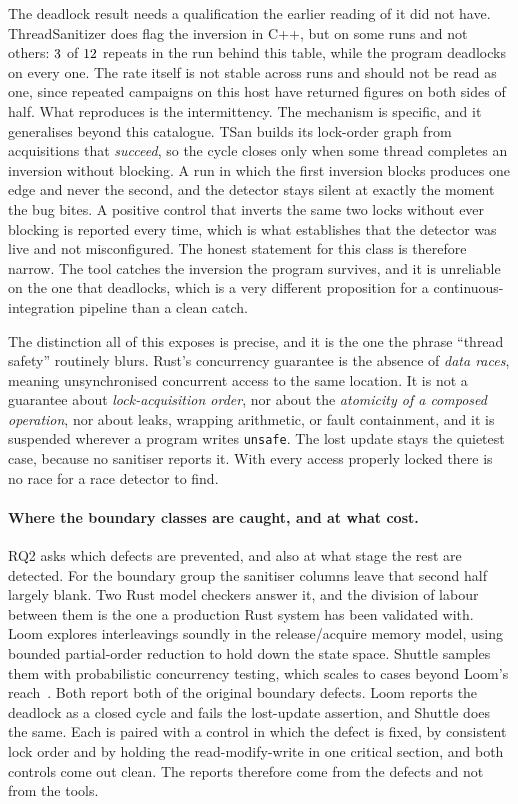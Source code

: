 \documentclass[english,oneside,a4paper,censored,csm,software-track-2020]{HYthesisML}
\begin{document}
The deadlock result needs a qualification the earlier reading of it did not have.
ThreadSanitizer does flag the inversion in C++, but on some runs and not others:
$3$ of $12$ repeats in the run behind this table, while the
program deadlocks on every one. The rate itself is not stable across runs and should not be read
as one, since repeated campaigns on this host have returned figures on both sides of half. What
reproduces is the intermittency. The mechanism is specific, and it generalises beyond this catalogue. TSan builds its lock-order
graph from acquisitions that \emph{succeed}, so the cycle closes only when some thread completes
an inversion without blocking. A run in which the first inversion blocks produces one edge and
never the second, and the detector stays silent at exactly the moment the bug bites. A
positive control that inverts the same two locks without ever blocking is reported every time,
which is what establishes that the detector was live and not misconfigured. The honest
statement for this class is therefore narrow. The tool catches the inversion the program survives,
and it is unreliable on the one that deadlocks, which is a very different proposition for a
continuous-integration pipeline than a clean catch.

The distinction all of this exposes is precise, and it is the one the phrase ``thread
safety'' routinely blurs. Rust's concurrency guarantee is the absence of \emph{data races},
meaning unsynchronised concurrent access to the same location. It is not a guarantee about
\emph{lock-acquisition order}, nor about the \emph{atomicity of a composed operation}, nor
about leaks, wrapping arithmetic, or fault containment, and it is suspended wherever a
program writes \texttt{unsafe}. The lost update stays the quietest
case, because no sanitiser reports it. With every access properly locked there is no race for a
race detector to find.

\paragraph{Where the boundary classes are caught, and at what cost.}
RQ2 asks which defects are prevented, and also at what stage the rest are detected. For
the boundary group the sanitiser columns leave that second half largely blank. Two Rust model
checkers answer it, and the division of labour between them is the one a production Rust system
has been validated with. Loom explores interleavings soundly in the release/acquire memory
model, using bounded partial-order reduction to hold down the state space. Shuttle samples
them with probabilistic concurrency testing, which scales to cases beyond Loom's
reach~\cite{bornholt2021shardstore}. Both report both
of the original boundary defects. Loom reports the deadlock as a closed cycle and fails the
lost-update assertion, and Shuttle does the same. Each is paired with a control in which the
defect is fixed, by consistent lock order and by holding the read-modify-write in one critical
section, and both controls come out clean. The reports therefore come from the defects
and not from the tools.
\end{document}
